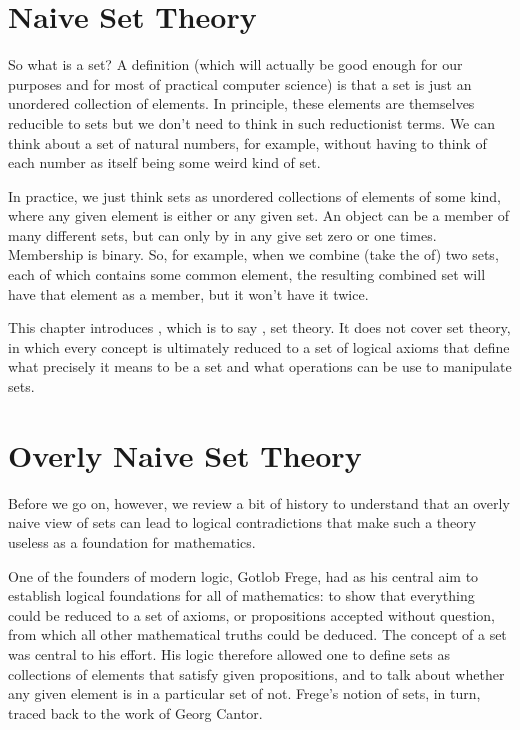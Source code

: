 \documentclass[letterpaper,10pt,english]{sphinxmanual}
\begin{document}
\section{Naive Set Theory}
\label{\detokenize{07-set-theory:naive-set-theory}}
So what is a set? A  definition (which will actually be good
enough for our purposes and for most of practical computer science) is
that a set is just an unordered collection of elements. In principle,
these elements are themselves reducible to sets but we don’t need to
think in such reductionist terms. We can think about a set of natural
numbers, for example, without having to think of each number as itself
being some weird kind of set.

In practice, we just think sets as unordered collections of elements
of some kind, where any given element is either  or  any
given set. An object can be a member of many different sets, but can
only by in any give set zero or one times. Membership is binary.  So,
for example, when we combine (take the  of) two sets, each of
which contains some common element, the resulting combined set will
have that element as a member, but it won’t have it twice.

This chapter introduces , which is to say , set theory. It does not cover  set theory, in
which every concept is ultimately reduced to a set of logical axioms
that define what precisely it means to be a set and what operations
can be use to manipulate sets.


\section{Overly Naive Set Theory}
\label{\detokenize{07-set-theory:overly-naive-set-theory}}
Before we go on, however, we review a bit of history to understand
that an overly naive view of sets can lead to logical contradictions
that make such a theory useless as a foundation for mathematics.

One of the founders of modern logic, Gotlob Frege, had as his central
aim to establish logical foundations for all of mathematics: to show
that everything could be reduced to a set of axioms, or propositions
accepted without question, from which all other mathematical truths
could be deduced.  The concept of a set was central to his effort. His
logic therefore allowed one to define sets as collections of elements
that satisfy given propositions, and to talk about whether any given
element is in a particular set of not. Frege’s notion of sets, in
turn, traced back to the work of Georg Cantor.
\end{document}
